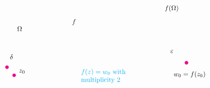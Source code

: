 \documentclass[12pt]{article}
\begin{document}
\begin{theorem}
\[\begin{tikzpicture}[x=0.75pt,y=0.75pt,yscale=-.9,xscale=.9]
        \draw  [color=magenta  ,draw opacity=1 ][fill=magenta  ,fill opacity=1 ] (432.67,157.21) .. controls (432.67,155.62) and (431.38,154.33) .. (429.79,154.33) .. controls (428.21,154.33) and (426.92,155.62) .. (426.92,157.21) .. controls (426.92,158.79) and (428.21,160.08) .. (429.79,160.08) .. controls (431.38,160.08) and (432.67,158.79) .. (432.67,157.21) -- cycle ;
        \draw  [color=magenta  ,draw opacity=1 ][fill=magenta  ,fill opacity=1 ] (127.59,179.54) .. controls (127.59,177.95) and (126.3,176.67) .. (124.71,176.67) .. controls (123.13,176.67) and (121.84,177.95) .. (121.84,179.54) .. controls (121.84,181.12) and (123.13,182.41) .. (124.71,182.41) .. controls (126.3,182.41) and (127.59,181.12) .. (127.59,179.54) -- cycle ;
        \draw  [color=magenta  ,draw opacity=1 ][fill=magenta  ,fill opacity=1 ] (114.92,165.21) .. controls (114.92,163.62) and (113.63,162.33) .. (112.05,162.33) .. controls (110.46,162.33) and (109.18,163.62) .. (109.18,165.21) .. controls (109.18,166.79) and (110.46,168.08) .. (112.05,168.08) .. controls (113.63,168.08) and (114.92,166.79) .. (114.92,165.21) -- cycle ;
        
        \draw (129,91.4) node [anchor=north west][inner sep=0.75pt]  [xscale=0.8,yscale=0.8]  {$\Omega $};
        \draw (132,168.4) node [anchor=north west][inner sep=0.75pt]  [xscale=0.8,yscale=0.8]  {$z_{0}$};
        \draw (405.75,171.09) node [anchor=north west][inner sep=0.75pt]  [xscale=0.8,yscale=0.8]  {$w_{0} =f( z_{0})$};
        \draw (226,78.4) node [anchor=north west][inner sep=0.75pt]  [xscale=0.8,yscale=0.8]  {$f$};
        \draw (390,53.4) node [anchor=north west][inner sep=0.75pt]  [xscale=0.8,yscale=0.8]  {$f( \Omega )$};
        \draw (115.95,141.47) node [anchor=north west][inner sep=0.75pt]  [xscale=0.8,yscale=0.8]  {$\delta $};
        \draw (399.95,133.47) node [anchor=north west][inner sep=0.75pt]  [xscale=0.8,yscale=0.8]  {$\varepsilon $};
        \draw (242,167) node [anchor=north west][inner sep=0.75pt]  [color=cyan  ,opacity=1 ,xscale=0.8,yscale=0.8] [align=left] {$\displaystyle f( z) =w_{0}$ with \\multiplicity 2};
        
        
        \end{tikzpicture}
        \]
\end{theorem}
\end{document}
